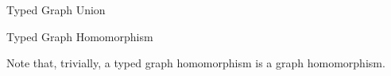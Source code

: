 \begin{definition}{Typed Graph Union\\}
\label{def:typed_graph_union}
\end{definition}


\begin{definition}{Typed Graph Homomorphism\\}
\label{def:typed_graph_homomorphism}
\end{definition}

Note that, trivially, a typed graph homomorphism is a graph homomorphism.

% 
% 


% 

